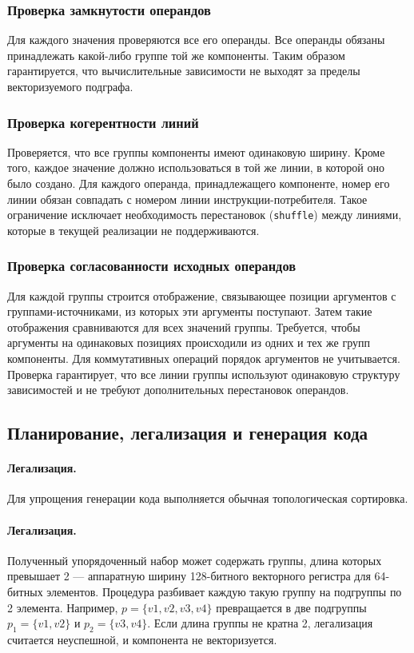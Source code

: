 \subsubsection{Проверка замкнутости операндов}
Для каждого значения проверяются все его операнды. 
Все операнды обязаны принадлежать какой-либо группе той же компоненты. 
Таким образом гарантируется, что вычислительные зависимости не выходят за пределы векторизуемого подграфа.

\subsubsection{Проверка когерентности линий}
Проверяется, что все группы компоненты имеют одинаковую ширину. 
Кроме того, каждое значение должно использоваться в той же линии, в которой оно было создано. 
Для каждого операнда, принадлежащего компоненте, номер его линии обязан совпадать с номером линии инструкции-потребителя. 
Такое ограничение исключает необходимость перестановок (\texttt{shuffle}) между линиями, которые в текущей реализации не поддерживаются.

\subsubsection{Проверка согласованности исходных операндов}
Для каждой группы строится отображение, связывающее позиции аргументов с группами-источниками, 
из которых эти аргументы поступают. 
Затем такие отображения сравниваются для всех значений группы. 
Требуется, чтобы аргументы на одинаковых позициях происходили из одних и тех же групп компоненты. 
Для коммутативных операций порядок аргументов не учитывается. 
Проверка гарантирует, что все линии группы используют одинаковую структуру зависимостей и не требуют дополнительных перестановок операндов.


\subsection{Планирование, легализация и генерация кода}
\label{sec:codegen}

\paragraph{Легализация.}
Для упрощения генерации кода выполняется обычная топологическая сортировка.

\paragraph{Легализация.}
Полученный упорядоченный набор может содержать группы, длина которых превышает 2 --- 
аппаратную ширину 128-битного векторного регистра для 64-битных элементов. 
Процедура разбивает каждую такую группу на подгруппы по 2 элемента. Например, $p = \{v1, v2, v3, v4\}$ 
превращается в две подгруппы $p_1 = \{v1, v2\}$ и $p_2 = \{v3, v4\}$. 
Если длина группы не кратна 2, легализация считается неуспешной, и компонента не векторизуется.

